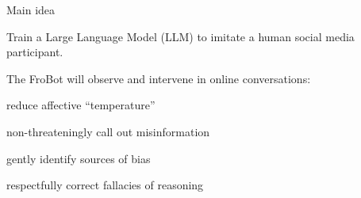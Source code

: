 \documentclass[12pt]{beamer}
\begin{document}
\begin{frame}[c]{Main idea}

Train a Large Language Model (LLM) to imitate a human social media participant.

\vspace{-.3in}
\pause


\pause
    
The FroBot will observe and intervene in online conversations:

\small
\begin{compactitem}
\item reduce affective ``temperature''
\item non-threateningly call out misinformation
\item gently identify sources of bias
\item respectfully correct fallacies of reasoning
\end{compactitem}

\end{frame}
\end{document}
